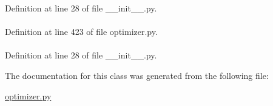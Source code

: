 \-Definition at line 28 of file \-\_\-\-\_\-init\-\_\-\-\_\-.\-py.

\hypertarget{classforcebalance_1_1optimizer_1_1Optimizer_a145e90c7776604285424a54ed484d651}{
\paragraph[{\-Val}]{}}\label{classforcebalance_1_1optimizer_1_1Optimizer_a145e90c7776604285424a54ed484d651}


\-Definition at line 423 of file optimizer.\-py.

\hypertarget{classforcebalance_1_1BaseClass_afd68efa29ccd2f320f4cf82198214aac}{
\paragraph[{verbose\-\_\-options}]{}}\label{classforcebalance_1_1BaseClass_afd68efa29ccd2f320f4cf82198214aac}


\-Definition at line 28 of file \-\_\-\-\_\-init\-\_\-\-\_\-.\-py.



\-The documentation for this class was generated from the following file\-:\begin{DoxyCompactItemize}
\item 
\hyperlink{optimizer_8py}{optimizer.\-py}\end{DoxyCompactItemize}
